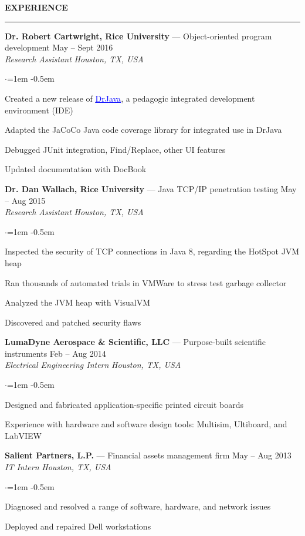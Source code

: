 \documentclass[10pt, a4paper]{article}
\newenvironment{aSection}[1]{
    \medskip \textbf{\uppercase{#1}}
    \smallskip
    \hrule
    \begin{list}{}{
            \setlength{\leftmargin}{1.5em}
        }
    \item[]
    }{
    \end{list}
}
\newenvironment{aSubsection}[4]{
    {#1} \hfill {#2} \\
    \textit{#3} \hfill \textit{#4}
    \smallskip
    \begin{list}{$\cdot$}{\leftmargin=1em}
    \itemsep -0.5em \vspace{-0.5em}
    }{
    \end{list}
    \vspace{0.5em}
}
\begin{document}
\begin{aSection}{Experience}
    \begin{aSubsection}
        {\textbf{Dr. Robert Cartwright, Rice University} --- Object-oriented program development}
        {May -- Sept 2016}
        {Research Assistant}
        {Houston, TX, USA}
    \item Created a new release of
        \href{http://www.drjava.org}{\textcolor{blue}{\underline{DrJava}}}, a pedagogic integrated
        development environment (IDE)
    \item Adapted the JaCoCo Java code coverage library for integrated use in DrJava
    \item Debugged JUnit integration, Find/Replace, other UI features
    \item Updated documentation with DocBook
    \end{aSubsection}

    \begin{aSubsection}
        {\textbf{Dr. Dan Wallach, Rice University} --- Java TCP/IP penetration testing}
        {May -- Aug 2015}
        {Research Assistant}
        {Houston, TX, USA}
    \item Inspected the security of TCP connections in Java 8, regarding the HotSpot JVM heap
    \item Ran thousands of automated trials in VMWare to stress test garbage collector
    \item Analyzed the JVM heap with VisualVM
    \item Discovered and patched security flaws
    \end{aSubsection}

    \begin{aSubsection}
        {\textbf{LumaDyne Aerospace \& Scientific, LLC} --- Purpose-built scientific
        instruments}
        {Feb -- Aug 2014}
        {Electrical Engineering Intern}
        {Houston, TX, USA}
    \item Designed and fabricated application-specific printed circuit boards
    \item Experience with hardware and software design tools: Multisim, Ultiboard, and LabVIEW
    \end{aSubsection}

    \begin{aSubsection}
        {\textbf{Salient Partners, L.P.} --- Financial assets management firm}
        {May -- Aug 2013}
        {IT Intern}
        {Houston, TX, USA}
    \item Diagnosed and resolved a range of software, hardware, and network issues
    \item Deployed and repaired Dell workstations
    \end{aSubsection}
\end{aSection}
\end{document}
